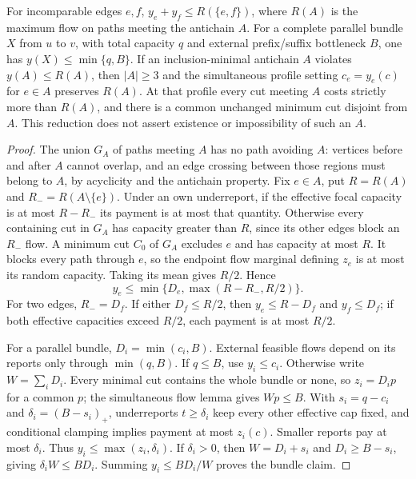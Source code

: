 \begin{proposition}\label{noise:antichain}
For incomparable edges $e,f$, $y_e+y_f\le R(\{e,f\})$, where $R(A)$ is
the maximum flow on paths meeting the antichain $A$. For a complete parallel
bundle $X$ from $u$ to $v$, with total capacity $q$ and external prefix/suffix
bottleneck $B$, one has $y(X)\le\min\{q,B\}$.
If an inclusion-minimal antichain $A$ violates $y(A)\le R(A)$, then
$|A|\ge3$ and the simultaneous profile setting $c_e=y_e(c)$ for $e\in A$
preserves $R(A)$. At that profile every cut meeting $A$ costs strictly more
than $R(A)$, and there is a common unchanged minimum cut disjoint from $A$.
This reduction does not assert existence or impossibility of such an $A$.
\end{proposition}
\begin{proof}
The union $G_A$ of paths meeting $A$ has no path avoiding $A$: vertices before
and after $A$ cannot overlap, and an edge crossing between those regions
must belong to $A$, by acyclicity and the antichain property.
Fix $e\in A$, put $R=R(A)$ and $R_-=R(A\setminus\{e\})$. Under an
own underreport, if the effective focal capacity is at most $R-R_-$ its
payment is at most that quantity. Otherwise every containing cut in $G_A$
has capacity greater than $R$, since its other edges block an $R_-$ flow.
A minimum cut $C_0$ of $G_A$ excludes $e$ and has capacity at most $R$.
It blocks every path through $e$, so the endpoint flow marginal defining
$z_e$ is at most its random capacity. Taking its mean gives $R/2$. Hence
\[
 y_e\le\min\{D_e,\max(R-R_-,R/2)\}.                 \tag{A}
\]
For two edges, $R_-=D_f$. If either $D_f\le R/2$, then
$y_e\le R-D_f$ and $y_f\le D_f$; if both effective capacities exceed
$R/2$, each payment is at most $R/2$.

For a parallel bundle, $D_i=\min(c_i,B)$. External feasible flows depend
on its reports only through $\min(q,B)$. If $q\le B$, use $y_i\le c_i$.
Otherwise write $W=\sum_iD_i$. Every minimal cut contains the whole bundle
or none, so $z_i=D_ip$ for a common $p$; the simultaneous flow lemma gives
$Wp\le B$. With $s_i=q-c_i$ and $\delta_i=(B-s_i)_+$, underreports
$t\ge\delta_i$ keep every other effective cap fixed, and conditional
clamping implies payment at most $z_i(c)$. Smaller reports pay at most
$\delta_i$. Thus $y_i\le\max(z_i,\delta_i)$. If $\delta_i>0$, then
$W=D_i+s_i$ and $D_i\ge B-s_i$, giving
$\delta_iW\le BD_i$. Summing $y_i\le BD_i/W$ proves the bundle claim.


\end{proof}
